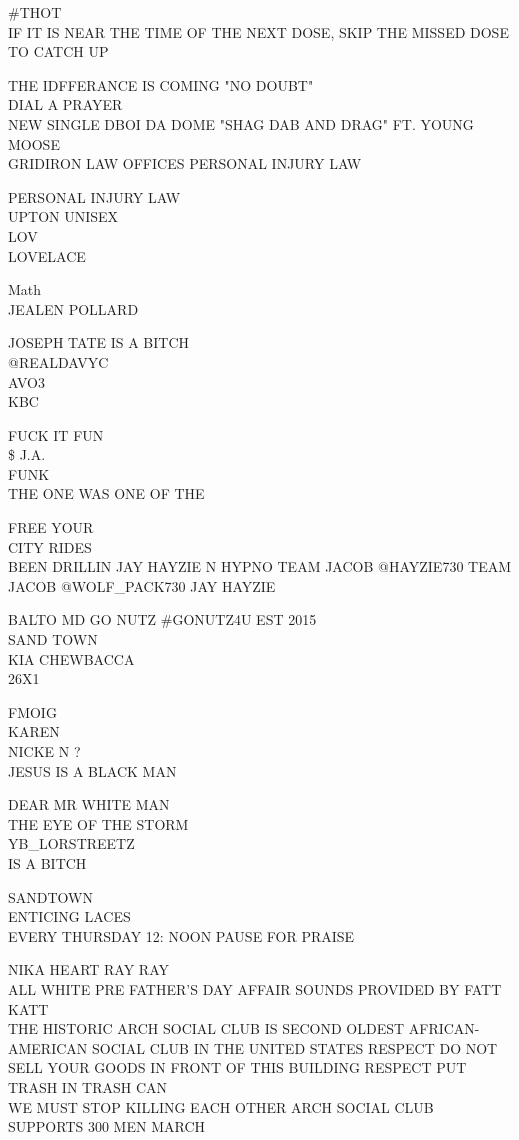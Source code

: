\documentclass[10pt,letterpaper]{article}
\begin{document}
\#THOT\\
IF IT IS NEAR THE TIME OF THE NEXT DOSE, SKIP THE MISSED DOSE TO CATCH UP

THE IDFFERANCE IS COMING "NO DOUBT"\\
DIAL A PRAYER\\
NEW SINGLE DBOI DA DOME "SHAG DAB AND DRAG" FT. YOUNG MOOSE\\
GRIDIRON LAW OFFICES PERSONAL INJURY LAW

PERSONAL INJURY LAW\\
UPTON UNISEX\\
LOV\\
LOVELACE

Math\\
JEALEN POLLARD

JOSEPH TATE IS A BITCH\\
@REALDAVYC\\
AVO3\\
KBC

FUCK IT FUN\\
\$ J.A.\\
FUNK\\
THE ONE WAS ONE OF THE

FREE YOUR\\
CITY RIDES\\
BEEN DRILLIN JAY HAYZIE N HYPNO TEAM JACOB @HAYZIE730 TEAM JACOB @WOLF\_PACK730 JAY HAYZIE

BALTO MD GO NUTZ \#GONUTZ4U EST 2015\\
SAND TOWN\\
KIA CHEWBACCA\\
26X1

FMOIG\\
KAREN\\
NICKE N ?\\
JESUS IS A BLACK MAN

DEAR MR WHITE MAN\\
THE EYE OF THE STORM\\
YB\_LORSTREETZ\\
IS A BITCH

SANDTOWN\\
ENTICING LACES\\
EVERY THURSDAY 12: NOON PAUSE FOR PRAISE

NIKA HEART RAY RAY\\
ALL WHITE PRE FATHER'S DAY AFFAIR SOUNDS PROVIDED BY FATT KATT\\
THE HISTORIC ARCH SOCIAL CLUB IS SECOND OLDEST AFRICAN{-}AMERICAN SOCIAL CLUB IN THE UNITED STATES RESPECT DO NOT SELL YOUR GOODS IN FRONT OF THIS BUILDING RESPECT PUT TRASH IN TRASH CAN\\
WE MUST STOP KILLING EACH OTHER ARCH SOCIAL CLUB SUPPORTS 300 MEN MARCH
\end{document}

